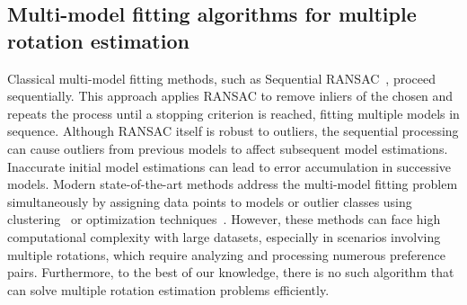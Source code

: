 \subsection{Multi-model fitting algorithms for multiple rotation estimation}
Classical multi-model fitting methods, such as Sequential RANSAC~\cite{zuliani2005multiransac}, proceed sequentially. This approach applies RANSAC to remove inliers of the chosen and repeats the process until a stopping criterion is reached, fitting multiple models in sequence. Although RANSAC itself is robust to outliers, the sequential processing can cause outliers from previous models to affect subsequent model estimations. Inaccurate initial model estimations can lead to error accumulation in successive models. Modern state-of-the-art methods address the multi-model fitting problem simultaneously by assigning data points to models or outlier classes using clustering~\cite{magri2014t} or optimization techniques~\cite{barath2019progressive}. However, these methods can face high computational complexity with large datasets, especially in scenarios involving multiple rotations, which require analyzing and processing numerous preference pairs. Furthermore, to the best of our knowledge, there is no such algorithm that can solve multiple rotation estimation problems efficiently. 
